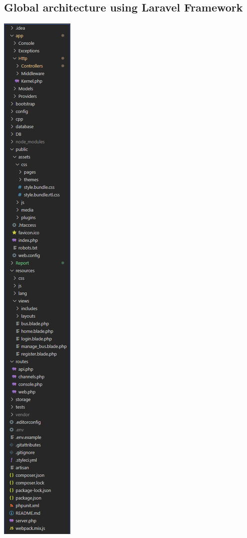 \documentclass[12pt,a4paper,openany]{book}
\begin{document}
\subsection{Global architecture using Laravel Framework}
\begin{minipage}{0.2\linewidth}
\begin{center}
	\includegraphics[scale=0.65]{Figs/fig5}
\end{center}
\end{minipage}\hfill
\end{document}
